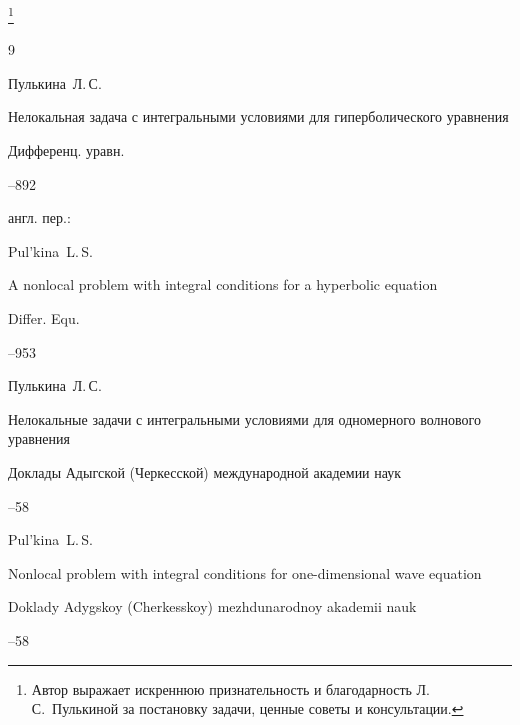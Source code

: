\thanks{Автор выражает искреннюю признательность и благодарность Л.\,С.~Пулькиной за постановку задачи, ценные советы и консультации.}



\pagebreak



\begin{thebibliography}{9}




\by  Пулькина~Л.\,С.

\paper  Нелокальная задача с интегральными условиями для гиперболического уравнения

\jour Дифференц. уравн.




--892

\transl англ. пер.:~

\by Pul'kina~L.\,S.

\paper A nonlocal problem with integral conditions for a hyperbolic equation

\jour Differ. Equ.




–953 




\by Пулькина~Л.\,С.

\paper Нелокальные задачи с интегральными условиями для одномерного волнового уравнения

\jour Доклады Адыгской (Черкесской) международной академии наук




--58

\misctransl 

\by Pul'kina~L.\,S.

\paper Nonlocal problem with integral conditions for one-dimensional wave equation

\jour Doklady Adygskoy (Cherkesskoy) mezhdunarodnoy akademii nauk




--58




\end{thebibliography}
